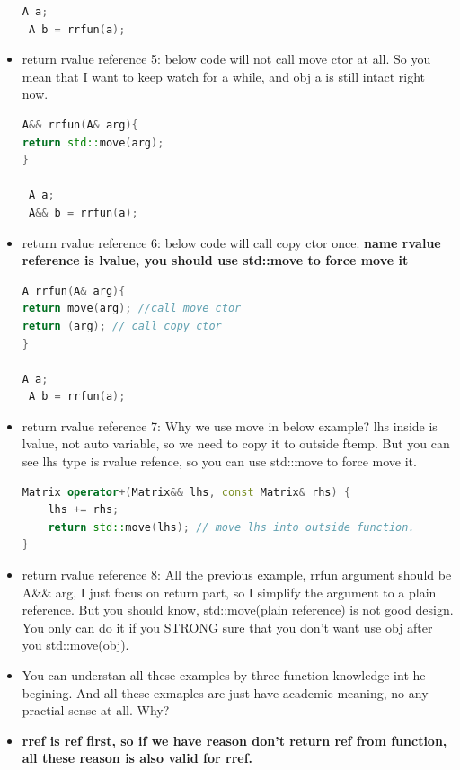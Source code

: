 \documentclass[a4paper,12pt,twoside]{book}
\begin{document}
\begin{itemize}
\begin{lstlisting}[frame=single, language=c++]
 A a;
 A b = rrfun(a);
\end{lstlisting}

\item return rvalue reference 5:   below code will not call move ctor at all. So you mean that I want to keep watch for a while, and obj a is still intact right now.
\begin{lstlisting}[frame=single, language=c++]
A&& rrfun(A& arg){
return std::move(arg);
}

 A a;
 A&& b = rrfun(a);
\end{lstlisting}

\item return rvalue reference 6:   below code will call copy ctor once. \textbf{name rvalue reference is lvalue, you should use std::move to force move it}
\begin{lstlisting}[frame=single, language=c++]
A rrfun(A& arg){
return move(arg); //call move ctor 
return (arg); // call copy ctor
}

A a;
 A b = rrfun(a);
\end{lstlisting}

\item return rvalue reference 7: Why we use move in below example? lhs inside is lvalue, not auto variable,  so we need to copy it to outside ftemp. But you can see lhs type is rvalue refence, so you can use std::move to force move it.
\begin{lstlisting}[frame=single, language=c++]
Matrix operator+(Matrix&& lhs, const Matrix& rhs) {
    lhs += rhs;
    return std::move(lhs); // move lhs into outside function.
}
\end{lstlisting}

\item return rvalue reference 8: All the previous example, rrfun argument should be A\&\& arg,  I just focus on return part, so I simplify the argument to a plain reference. But you should know, std::move(plain reference) is not good design. You only can do it if you STRONG sure that you don't want use obj after you std::move(obj).

\item You can understan all these examples by three function knowledge int he begining. And all these exmaples are just have academic meaning, no any practial sense at all. Why?

\item \textbf{rref is ref first, so if we have reason don't return ref from function, all these reason is also valid for rref.}


\end{itemize}
\end{document}
